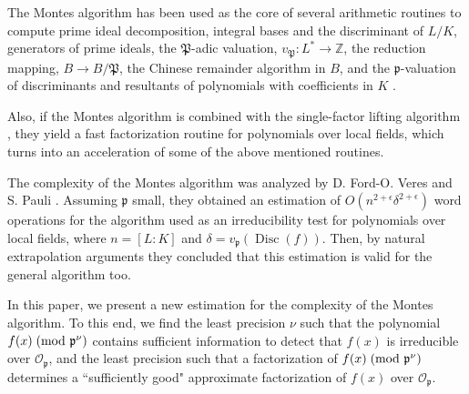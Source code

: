\documentclass{amsart}
\begin{document}
The Montes algorithm has been used as the core of several arithmetic routines to compute prime ideal decomposition, integral bases and the discriminant of $L/K$, generators of prime ideals, the ${\mathfrak{P}}$-adic valuation, $v_{\mathfrak{P}}\colon L^*\longrightarrow {\mathbb Z}$, the reduction mapping, $B\longrightarrow B/{\mathfrak{P}}$, the Chinese remainder algorithm in $B$, and the ${\mathfrak{p}}$-valuation of discriminants and resultants of polynomials with coefficients in $K$ \cite{algorithm,bases,newapp,Ndiff}.    

Also, if the Montes algorithm is combined with the single-factor lifting algorithm \cite{GNP}, they yield a fast factorization routine for polynomials over local fields, which turns into an acceleration of some of the above mentioned routines.   

The complexity of the Montes algorithm was analyzed by D. Ford-O. Veres \cite{FV} and S. Pauli \cite{pauli}. Assuming ${\mathfrak{p}}$ small, they obtained an estimation of $O(n^{2+\epsilon}\delta^{2+\epsilon})$ word operations for the algorithm used as an irreducibi\-lity test for polynomials over local fields, where $n=[L\colon K]$ and $\delta=v_{\mathfrak{p}}({\operatorname{Disc}}(f))$. Then, by natural extrapolation arguments they concluded that this estimation is valid for the general algorithm too. 

In this paper, we present a new estimation for the complexity of the Montes algorithm. To this end, we find the least precision $\nu$ such that the polynomial $f(x) {\; \mbox{\rm(mod }{{{\mathfrak{p}}^\nu}})}$ contains sufficient information to detect that $f(x)$ is irreducible over ${\mathcal{O}}_{\mathfrak{p}}$, and the least precision such that a factorization of $f(x) {\; \mbox{\rm(mod }{{{\mathfrak{p}}^\nu}})}$ determines a ``sufficiently good" approximate factorization of $f(x)$ over ${\mathcal{O}}_{\mathfrak{p}}$.
\end{document}
